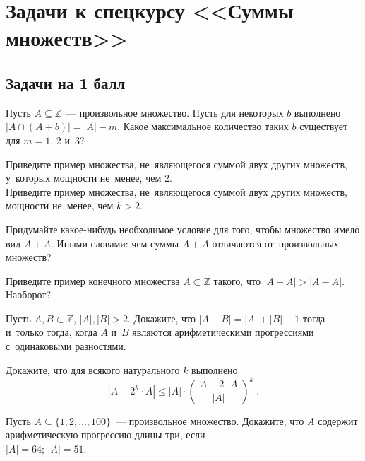 
\section*{Задачи к спецкурсу <<Суммы множеств>>}



\subsection*{Задачи на 1 балл}

\begin{problems}

\item
Пусть $A \subseteq \mathbb{Z}$~--- произвольное множество.
Пусть для некоторых $b$ выполнено
\(
    |A \cap (A + b)| = |A| - m
\).
Какое максимальное количество таких $b$ существует для $m = 1$, $2$ и~$3$?

\item
\sp
Приведите пример множества, не~являющегося суммой двух других множеств,
у~которых мощности не~менее, чем 2.
\\
\sp
Приведите пример множества, не~являющегося суммой двух других множеств,
мощности не~менее, чем $k>2$.

\item
Придумайте какое-нибудь необходимое условие для того, чтобы множество имело
вид $A + A$.
Иными словами: чем суммы $A + A$ отличаются от~произвольных множеств?

\item
Приведите пример конечного множества $A \subset \mathbb{Z}$ такого, что
$|A + A| > |A - A|$.
Наоборот?

\item
Пусть $A, B \subset \mathbb{Z}$, $|A|, |B| > 2$.
Докажите, что $|A + B| = |A| + |B| - 1$ тогда и~только тогда, когда $A$ и~$B$
являются арифметическими прогрессиями с~одинаковыми разностями.

\item
Докажите, что для всякого натурального $k$ выполнено
\[
    |A - 2^{k} \cdot A|
\leq
    |A| \cdot
    \left(
        \frac{|A - 2 \cdot A|}{|A|}
    \right)^k
\;.\]

\item
Пусть $A \subseteq \{ 1,2, \ldots, 100 \}$~--- произвольное множество.
Докажите, что $A$ содержит арифметическую прогрессию длины три, если
\\
\sp $|A| = 64$;
\quad
\sp $|A| = 51$.


\end{problems}
